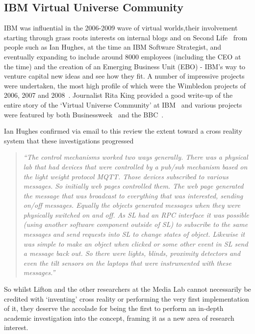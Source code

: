 \subsection{IBM Virtual Universe Community}
IBM was influential in the 2006-2009 wave of virtual worlds,their involvement starting through grass roots interests on internal blogs and on Second Life~\cite{Hughes2006, Hughes2006a,Hughes2006b} from people such as Ian Hughes, at the time an IBM Software Strategist, and eventually expanding to include around 8000 employees (including the CEO at the time) and the creation of an Emerging Business Unit (EBO) - IBM's way to venture capital new ideas and see how they fit. A number of impressive projects were undertaken, the most high profile of which were the Wimbledon projects of 2006, 2007 and 2008~\cite{Hughes2006c, Hughes2009}. Journalist Rita King provided a good write-up of the entire story of the `Virtual Universe Community' at IBM~\cite{King2008} and various projects were featured by both Businessweek~\cite{Life2006} and the BBC~\cite{Mason2007}.

Ian Hughes confirmed via email to this review the extent toward a cross reality system that these investigations progressed

\begin{quote}
\textit{``The control mechanisms worked two ways generally. There was a physical lab that had devices that were controlled by a pub/sub mechanism based on the light weight protocol MQTT. Those devices subscribed to various messages. So initially web pages controlled them. The web page generated the message that was broadcast to everything that was interested, sending on/off messages. Equally the objects generated messages when they were physically switched on and off. As SL had an RPC interface it was possible (using another software component outside of SL) to subscribe to the same messages and send requests into SL to change states of object. Likewise it was simple to make an object when clicked or some other event in SL send a message back out. So there were lights, blinds, proximity detectors and even the tilt sensors on the laptops that were instrumented with these messages.''}
\end{quote}

So whilst Lifton and the other researchers at the Media Lab cannot necessarily be credited with `inventing' cross reality or performing the very first implementation of it, they deserve the accolade for being the first to perform an in-depth academic investigation into the concept, framing it as a new area of research interest.

